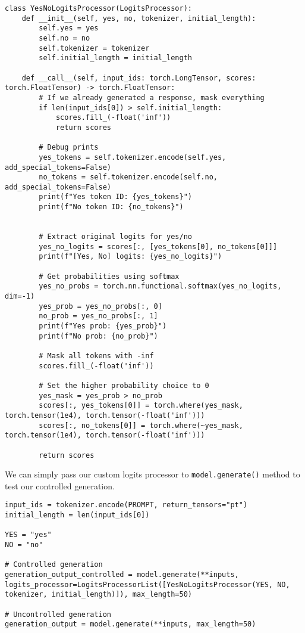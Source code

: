\begin{verbatim}
class YesNoLogitsProcessor(LogitsProcessor):
    def __init__(self, yes, no, tokenizer, initial_length):
        self.yes = yes
        self.no = no
        self.tokenizer = tokenizer
        self.initial_length = initial_length
        
    def __call__(self, input_ids: torch.LongTensor, scores: torch.FloatTensor) -> torch.FloatTensor:
        # If we already generated a response, mask everything
        if len(input_ids[0]) > self.initial_length:
            scores.fill_(-float('inf'))
            return scores
            
        # Debug prints
        yes_tokens = self.tokenizer.encode(self.yes, add_special_tokens=False)
        no_tokens = self.tokenizer.encode(self.no, add_special_tokens=False)
        print(f"Yes token ID: {yes_tokens}")
        print(f"No token ID: {no_tokens}")
        
        
        # Extract original logits for yes/no
        yes_no_logits = scores[:, [yes_tokens[0], no_tokens[0]]]
        print(f"[Yes, No] logits: {yes_no_logits}")
        
        # Get probabilities using softmax
        yes_no_probs = torch.nn.functional.softmax(yes_no_logits, dim=-1)
        yes_prob = yes_no_probs[:, 0]
        no_prob = yes_no_probs[:, 1]
        print(f"Yes prob: {yes_prob}")
        print(f"No prob: {no_prob}")
        
        # Mask all tokens with -inf
        scores.fill_(-float('inf'))
        
        # Set the higher probability choice to 0
        yes_mask = yes_prob > no_prob
        scores[:, yes_tokens[0]] = torch.where(yes_mask, torch.tensor(1e4), torch.tensor(-float('inf')))
        scores[:, no_tokens[0]] = torch.where(~yes_mask, torch.tensor(1e4), torch.tensor(-float('inf')))
        
        return scores
\end{verbatim}

We can simply pass our custom logits processor to \texttt{model.generate()} method to test our controlled generation.

\begin{verbatim}
input_ids = tokenizer.encode(PROMPT, return_tensors="pt")
initial_length = len(input_ids[0])

YES = "yes"
NO = "no"

# Controlled generation
generation_output_controlled = model.generate(**inputs, logits_processor=LogitsProcessorList([YesNoLogitsProcessor(YES, NO, tokenizer, initial_length)]), max_length=50)

# Uncontrolled generation
generation_output = model.generate(**inputs, max_length=50)
\end{verbatim}

